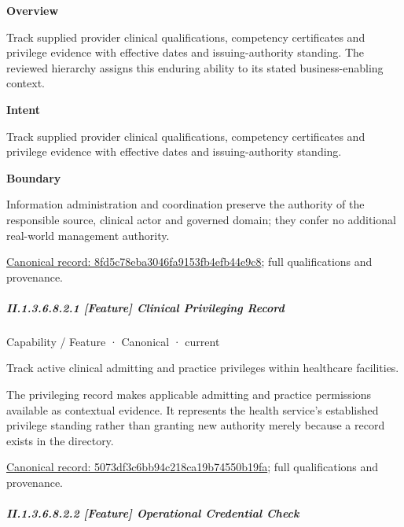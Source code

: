\textbf{Overview}



Track supplied provider clinical qualifications, competency certificates and privilege evidence with effective dates and issuing-authority standing. The reviewed hierarchy assigns this enduring ability to its stated business-enabling context.



\textbf{Intent}



Track supplied provider clinical qualifications, competency certificates and privilege evidence with effective dates and issuing-authority standing.



\textbf{Boundary}



Information administration and coordination preserve the authority of the responsible source, clinical actor and governed domain; they confer no additional real-world management authority.


{\footnotesize \href{../../../../continuum/strategy/capability/8fd5c78eba3046fa9153fb4efb44e9c8.md}{Canonical record: 8fd5c78eba3046fa9153fb4efb44e9c8}; full qualifications and provenance.}\par
\subparagraph*{II.1.3.6.8.2.1 [Feature] Clinical Privileging Record}
\label{navigation:II.1.3.6.8.2.1}

\label{element:5073df3c6bb94c218ca19b74550b19fa}
{\small Capability / Feature · Canonical · current}\par

Track active clinical admitting and practice privileges within healthcare facilities.



The privileging record makes applicable admitting and practice permissions available as contextual evidence. It represents the health service's established privilege standing rather than granting new authority merely because a record exists in the directory.


{\footnotesize \href{../../../../continuum/strategy/capability/feature/5073df3c6bb94c218ca19b74550b19fa.md}{Canonical record: 5073df3c6bb94c218ca19b74550b19fa}; full qualifications and provenance.}\par
\subparagraph*{II.1.3.6.8.2.2 [Feature] Operational Credential Check}
\label{navigation:II.1.3.6.8.2.2}


